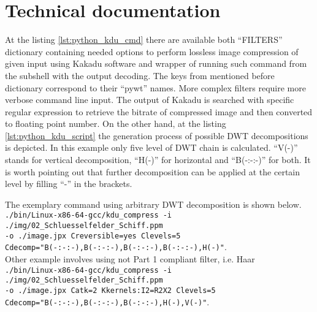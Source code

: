 \chapter*{Technical documentation}

At the listing \ref{lst:python_kdu_cmd} there are available both ``FILTERS'' dictionary
containing needed options to perform lossless image compression of given input using Kakadu
software and wrapper of running such command from the subshell with the output decoding.
The keys from mentioned before dictionary correspond to their ``pywt'' names. More complex
filters require more verbose command line input. The output of Kakadu is searched with
specific regular expression to retrieve the bitrate of compressed image and then converted to
floating point number. On the other hand, at the listing \ref{lst:python_kdu_script} the
generation process of possible DWT decompositions is depicted. In this example only five
level of DWT chain is calculated. ``V(-)'' stands for vertical decomposition, ``H(-)''
for horizontal and ``B(-:-:-)'' for both. It is worth pointing out that further decomposition
can be applied at the certain level by filling ``-'' in the brackets.

The exemplary command using arbitrary DWT decomposition is shown below. \\
\texttt{./bin/Linux-x86-64-gcc/kdu_compress -i ./img/02_Schluesselfelder_Schiff.ppm} \\
\texttt{-o ./image.jpx Creversible=yes Clevels=5} \\
\texttt{Cdecomp="B(-:-:-),B(-:-:-),B(-:-:-),B(-:-:-),H(-)"}. \\
Other example involves using not Part 1 compliant filter, i.e. Haar \\
\texttt{./bin/Linux-x86-64-gcc/kdu_compress -i ./img/02_Schluesselfelder_Schiff.ppm} \\
\texttt{-o ./image.jpx Catk=2 Kkernels:I2=R2X2 Clevels=5} \\
\texttt{Cdecomp="B(-:-:-),B(-:-:-),B(-:-:-),H(-),V(-)"}.


